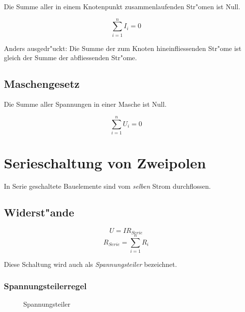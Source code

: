 \documentclass[german, 10pt, a4paper, headsepline]{scrreprt}
\theoremstyle{remark}
\begin{document}

Die Summe aller in einem Knotenpunkt zusammenlaufenden Str"omen ist Null.

\begin{displaymath}
	\sum^n_{i=1}I_i=0
\end{displaymath}

Anders ausgedr"uckt: Die Summe der zum Knoten hineinfliessenden Str"ome ist gleich der Summe der abfliessenden Str"ome.

\subsection{Maschengesetz}


Die Summe aller Spannungen in einer Masche ist Null.

\begin{displaymath}
	\sum^n_{i=1}U_i=0
\end{displaymath}

\section{Serieschaltung von Zweipolen}

In Serie geschaltete Bauelemente sind vom \textit{selben} Strom durchflossen.\\


\subsection{Widerst"ande}

\begin{displaymath}
	U=IR_{Serie}
\end{displaymath}
\begin{displaymath}
	R_{Serie}=\sum^n_{i=1}R_i
\end{displaymath}

Diese Schaltung wird auch als \textit{Spannungsteiler} bezeichnet.

\subsubsection{Spannungsteilerregel}

\begin{figure}[hbt]
 
 \centerline{\box\graph}
 \caption{Spannungsteiler}
 \label{spannungsteiler}
\end{figure}
\end{document}
